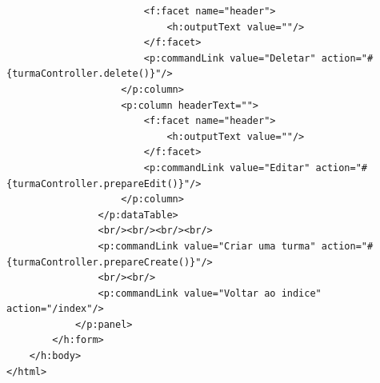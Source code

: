 \documentclass[12pt,a4paper]{article}
\begin{document}
\begin{lstlisting}
                        <f:facet name="header">
                            <h:outputText value=""/>
                        </f:facet>
                        <p:commandLink value="Deletar" action="#{turmaController.delete()}"/>
                    </p:column>
                    <p:column headerText="">
                        <f:facet name="header">
                            <h:outputText value=""/>
                        </f:facet>
                        <p:commandLink value="Editar" action="#{turmaController.prepareEdit()}"/>
                    </p:column>
                </p:dataTable> 
                <br/><br/><br/><br/>
                <p:commandLink value="Criar uma turma" action="#{turmaController.prepareCreate()}"/>
                <br/><br/>
                <p:commandLink value="Voltar ao indice" action="/index"/>
            </p:panel>
        </h:form>
    </h:body>
</html>
\end{lstlisting}
\end{document}

